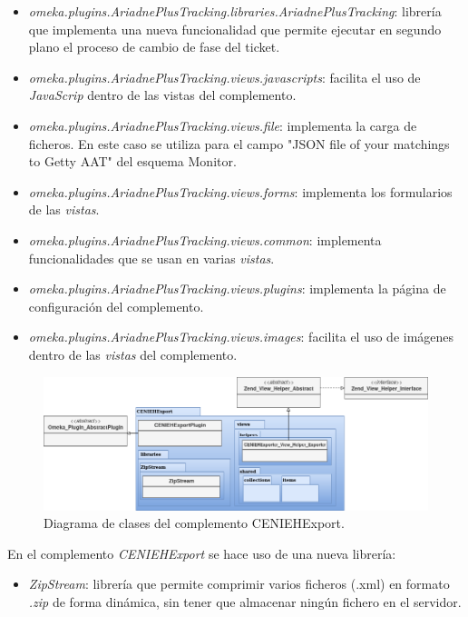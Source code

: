 \documentclass[
]{article}
\providecommand{\tightlist}{%
  \setlength{\itemsep}{0pt}\setlength{\parskip}{0pt}}
\begin{document}
\begin{itemize}
\tightlist
\item
  \emph{omeka.plugins.AriadnePlusTracking.libraries.AriadnePlusTracking}:
  librería que implementa una nueva funcionalidad que permite ejecutar
  en segundo plano el proceso de cambio de fase del ticket.
\item
  \emph{omeka.plugins.AriadnePlusTracking.views.javascripts}: facilita
  el uso de \emph{JavaScrip} dentro de las vistas del complemento.
\item
  \emph{omeka.plugins.AriadnePlusTracking.views.file}: implementa la
  carga de ficheros. En este caso se utiliza para el campo "JSON file of
  your matchings to Getty AAT" del esquema Monitor.
\item
  \emph{omeka.plugins.AriadnePlusTracking.views.forms}: implementa los
  formularios de las \emph{vistas}.
\item
  \emph{omeka.plugins.AriadnePlusTracking.views.common}: implementa
  funcionalidades que se usan en varias \emph{vistas}.
\item
  \emph{omeka.plugins.AriadnePlusTracking.views.plugins}: implementa la
  página de configuración del complemento.
\item
  \emph{omeka.plugins.AriadnePlusTracking.views.images}: facilita el uso
  de imágenes dentro de las \emph{vistas} del complemento.
\end{itemize}

\begin{figure}
\hypertarget{da-pck-7}{%
\centering
\includegraphics{../_static/images/pck-7.png}
\caption{Diagrama de clases del complemento
CENIEHExport.}\label{da-pck-7}
}
\end{figure}

En el complemento \emph{CENIEHExport} se hace uso de una nueva librería:

\begin{itemize}
\tightlist
\item
  \emph{ZipStream}: librería que permite comprimir varios ficheros
  (.xml) en formato \emph{.zip} de forma dinámica, sin tener que
  almacenar ningún fichero en el servidor.
\end{itemize}
\end{document}

